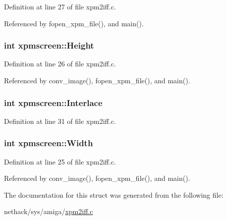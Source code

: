 Definition at line 27 of file xpm2iff.\+c.



Referenced by fopen\+\_\+xpm\+\_\+file(), and main().

\hypertarget{structxpmscreen_a0b3dfa02a3b81a573e8365010a81cd15}{
\subsubsection[{Height}]{\setlength{\rightskip}{0pt plus 5cm}int xpmscreen\+::\+Height}}\label{structxpmscreen_a0b3dfa02a3b81a573e8365010a81cd15}


Definition at line 26 of file xpm2iff.\+c.



Referenced by conv\+\_\+image(), fopen\+\_\+xpm\+\_\+file(), and main().

\hypertarget{structxpmscreen_acbfe221573608e3154c8ecd323a51655}{
\subsubsection[{Interlace}]{\setlength{\rightskip}{0pt plus 5cm}int xpmscreen\+::\+Interlace}}\label{structxpmscreen_acbfe221573608e3154c8ecd323a51655}


Definition at line 31 of file xpm2iff.\+c.

\hypertarget{structxpmscreen_a1e07e1bcddf0a0dec7d27740c669c706}{
\subsubsection[{Width}]{\setlength{\rightskip}{0pt plus 5cm}int xpmscreen\+::\+Width}}\label{structxpmscreen_a1e07e1bcddf0a0dec7d27740c669c706}


Definition at line 25 of file xpm2iff.\+c.



Referenced by conv\+\_\+image(), fopen\+\_\+xpm\+\_\+file(), and main().



The documentation for this struct was generated from the following file\+:\begin{DoxyCompactItemize}
\item 
nethack/sys/amiga/\hyperlink{xpm2iff_8c}{xpm2iff.\+c}\end{DoxyCompactItemize}
